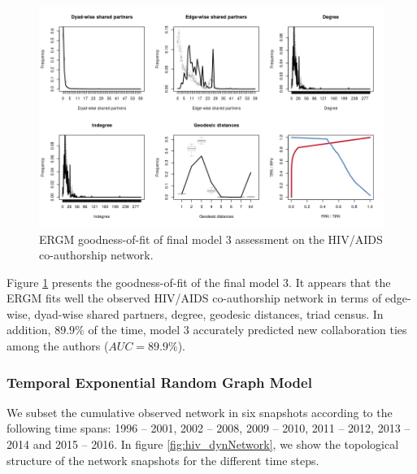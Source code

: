 \begin{figure}[!h]
\centering
\includegraphics[scale=0.65]{Chapters/hiv/statMod/ergm_gof2}
\caption{ERGM goodness-of-fit of final model 3 assessment on the HIV/AIDS co-authorship network.%
}
\label{fig:hiv_ergm-gof}
\end{figure}

Figure \ref{fig:hiv_ergm-gof} presents the goodness-of-fit of the final model 3. It appears that the ERGM fits well the observed HIV/AIDS co-authorship network in terms of edge-wise, dyad-wise shared partners, degree, geodesic distances, triad census. In addition, $89.9\%$ of the time, model 3 accurately predicted new collaboration ties among the authors ($AUC=89.9\%$).

\subsubsection{Temporal Exponential Random Graph Model}
\label{sec:hiv_results_tergm}
We subset the cumulative observed network in six snapshots according to the following time spans: 1996 -- 2001, 2002 -- 2008, 2009 -- 2010, 2011 -- 2012, 2013 -- 2014 and 2015 -- 2016. In figure \ref{fig:hiv_dynNetwork}, we show the topological structure of the network snapshots for the different time steps.

